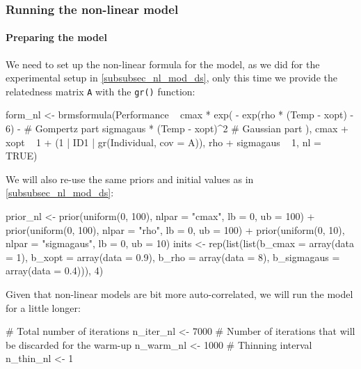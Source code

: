 \documentclass[a4paper,12pt,twoside]{article}
\begin{document}
\subsubsection{Running the non-linear model}

\paragraph{Preparing the model}
We need to set up the non-linear formula for the model, as we did for the experimental setup in \autoref{subsubsec_nl_mod_ds}, only this time we provide the relatedness matrix \texttt{A} with the \texttt{gr()} function:
\begin{Rinput}
form_nl <- brmsformula(Performance ~ cmax * exp(
                                        - exp(rho * (Temp - xopt) - 6) -       # Gompertz part
                                            sigmagaus * (Temp - xopt)^2        # Gaussian part
                                    ),
                       cmax + xopt ~ 1 + (1 | ID1 | gr(Individual, cov = A)),
                       rho + sigmagaus ~ 1,
                       nl = TRUE)
\end{Rinput}
We will also re-use the same priors and initial values as in \autoref{subsubsec_nl_mod_ds}:
\begin{Rinput}
prior_nl <-
    prior(uniform(0, 100), nlpar = "cmax", lb = 0, ub = 100) +
    prior(uniform(0, 100), nlpar = "rho", lb = 0, ub = 100) +
    prior(uniform(0, 10), nlpar = "sigmagaus", lb = 0, ub = 10)
inits <- rep(list(list(b_cmax      = array(data = 1),
                       b_xopt      = array(data = 0.9),
                       b_rho       = array(data = 8),
                       b_sigmagaus = array(data = 0.4))), 4)
\end{Rinput}
Given that non-linear models are bit more auto-correlated, we will run the model for a little longer:
\begin{Rinput}
# Total number of iterations
n_iter_nl <- 7000
# Number of iterations that will be discarded for the warm-up
n_warm_nl <- 1000
# Thinning interval
n_thin_nl <- 1
\end{Rinput}
\end{document}
